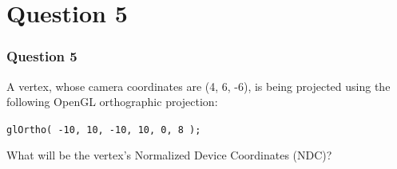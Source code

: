 \documentclass{beamer}
\begin{document}
\section{Question 5}

\begin{frame}
    \frametitle{Question 5}
    A vertex, whose camera coordinates are (4, 6, -6), is being projected using the following OpenGL orthographic projection:

    \vspace{1em}

    \begin{tcolorbox}[colback=violet!5!white]
        \centering
        \texttt{glOrtho( -10, 10, -10, 10, 0, 8 );}
    \end{tcolorbox}

    \vspace{1em}

    What will be the vertex's Normalized Device Coordinates (NDC)?
\end{frame}
\end{document}
